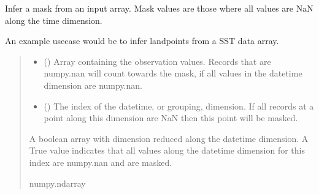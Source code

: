 \documentclass[letterpaper,10pt,english]{sphinxmanual}
\begin{document}
\begin{fulllineitems}
\label{\detokenize{misc:glomar_gridding.mask.mask_from_obs_array}}
\pysigstartsignatures
\pysiglinewithargsret
{}
{\sphinxparamcomma {}}
{}
\pysigstopsignatures
\sphinxAtStartPar
Infer a mask from an input array. Mask values are those where all values
are NaN along the time dimension.

\sphinxAtStartPar
An example use\sphinxhyphen{}case would be to infer land\sphinxhyphen{}points from a SST data array.
\begin{quote}\begin{description}
\begin{itemize}
\item {}
\sphinxAtStartPar
{} () \textendash{} Array containing the observation values. Records that are numpy.nan
will count towards the mask, if all values in the datetime dimension
are numpy.nan.

\item {}
\sphinxAtStartPar
{} () \textendash{} The index of the datetime, or grouping, dimension. If all records at
a point along this dimension are NaN then this point will be masked.

\end{itemize}

\sphinxAtStartPar
{} \textendash{} A boolean array with dimension reduced along the datetime dimension.
A True value indicates that all values along the datetime dimension
for this index are numpy.nan and are masked.

\sphinxAtStartPar
numpy.ndarray

\end{description}\end{quote}

\end{fulllineitems}

\end{document}
